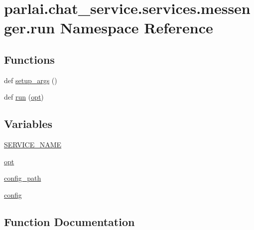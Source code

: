 \hypertarget{namespaceparlai_1_1chat__service_1_1services_1_1messenger_1_1run}{}\section{parlai.\+chat\+\_\+service.\+services.\+messenger.\+run Namespace Reference}
\label{namespaceparlai_1_1chat__service_1_1services_1_1messenger_1_1run}
\subsection*{Functions}
\begin{DoxyCompactItemize}
\item 
def \hyperlink{namespaceparlai_1_1chat__service_1_1services_1_1messenger_1_1run_a17bafea2534d593de1fbf1e0724e5b67}{setup\+\_\+args} ()
\item 
def \hyperlink{namespaceparlai_1_1chat__service_1_1services_1_1messenger_1_1run_ac422f71a04fc8363a81107c148e9ece2}{run} (\hyperlink{namespaceparlai_1_1chat__service_1_1services_1_1messenger_1_1run_adf01755b40d94d3488813990fee9cc87}{opt})
\end{DoxyCompactItemize}
\subsection*{Variables}
\begin{DoxyCompactItemize}
\item 
\hyperlink{namespaceparlai_1_1chat__service_1_1services_1_1messenger_1_1run_a99db00509aee322411c985412cf58cf8}{S\+E\+R\+V\+I\+C\+E\+\_\+\+N\+A\+ME}
\item 
\hyperlink{namespaceparlai_1_1chat__service_1_1services_1_1messenger_1_1run_adf01755b40d94d3488813990fee9cc87}{opt}
\item 
\hyperlink{namespaceparlai_1_1chat__service_1_1services_1_1messenger_1_1run_a6c755aedbbebd4467c65fe142cbd73a5}{config\+\_\+path}
\item 
\hyperlink{namespaceparlai_1_1chat__service_1_1services_1_1messenger_1_1run_aa5dcaaace4024e255bfdbebea518be6d}{config}
\end{DoxyCompactItemize}


\subsection{Function Documentation}
\mbox{\label{namespaceparlai_1_1chat__service_1_1services_1_1messenger_1_1run_ac422f71a04fc8363a81107c148e9ece2}} 
